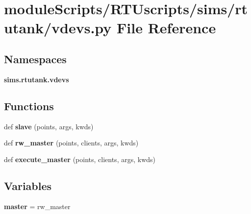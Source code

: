 \section{module\+Scripts/\+R\+T\+Uscripts/sims/rtutank/vdevs.py File Reference}
\label{rtutank_2vdevs_8py}
\subsection*{Namespaces}
\begin{DoxyCompactItemize}
\item 
 {\bf sims.\+rtutank.\+vdevs}
\end{DoxyCompactItemize}
\subsection*{Functions}
\begin{DoxyCompactItemize}
\item 
def {\bf slave} (points, args, kwds)
\item 
def {\bf rw\+\_\+master} (points, clients, args, kwds)
\item 
def {\bf execute\+\_\+master} (points, clients, args, kwds)
\end{DoxyCompactItemize}
\subsection*{Variables}
\begin{DoxyCompactItemize}
\item 
{\bf master} = rw\+\_\+master
\end{DoxyCompactItemize}
